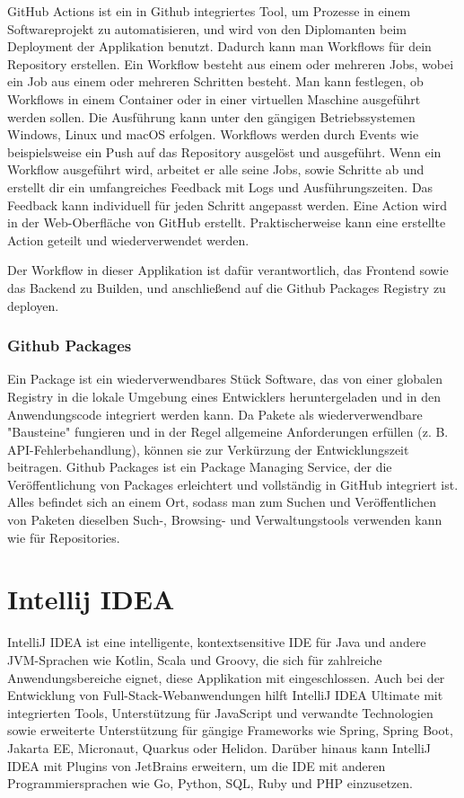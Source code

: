 GitHub Actions ist ein in Github integriertes Tool, um Prozesse in einem Softwareprojekt zu automatisieren, 
und wird von den Diplomanten beim Deployment der Applikation benutzt. 
Dadurch kann man Workflows für dein Repository erstellen. Ein Workflow besteht aus einem oder mehreren Jobs, 
wobei ein Job aus einem oder mehreren Schritten besteht. Man kann festlegen, ob Workflows in einem Container oder in einer virtuellen 
Maschine ausgeführt werden sollen. Die Ausführung kann unter den gängigen Betriebssystemen Windows, Linux und macOS erfolgen. 
Workflows werden durch Events wie beispielsweise ein Push auf das Repository ausgelöst und ausgeführt. Wenn ein Workflow ausgeführt wird, 
arbeitet er alle seine Jobs, sowie Schritte ab und erstellt dir ein umfangreiches Feedback mit Logs und Ausführungszeiten. 
Das Feedback kann individuell für jeden Schritt angepasst werden. Eine Action wird in der Web-Oberfläche von GitHub erstellt. 
Praktischerweise kann eine erstellte Action geteilt und wiederverwendet werden.
\cite{sysarch-github-4}

Der Workflow in dieser Applikation ist dafür verantwortlich, das Frontend sowie das Backend zu Builden, und anschließend auf die Github Packages Registry zu deployen.

\subsubsection{Github Packages}

Ein Package ist ein wiederverwendbares Stück Software, das von einer globalen Registry in die lokale Umgebung eines Entwicklers heruntergeladen und 
in den Anwendungscode integriert werden kann. Da Pakete als wiederverwendbare "Bausteine" fungieren und in der Regel allgemeine Anforderungen erfüllen 
(z. B. API-Fehlerbehandlung), können sie zur Verkürzung der Entwicklungszeit beitragen. Github Packages ist ein Package Managing Service, 
der die Veröffentlichung von Packages erleichtert und vollständig in GitHub integriert ist. Alles befindet sich an einem Ort, 
sodass man zum Suchen und Veröffentlichen von Paketen dieselben Such-, Browsing- und Verwaltungstools verwenden kann wie für Repositories.
\cite{sysarch-github-5}

\section{Intellij IDEA}

IntelliJ IDEA ist eine intelligente, kontextsensitive IDE für Java und andere JVM-Sprachen wie Kotlin, Scala und Groovy, die sich für zahlreiche 
Anwendungsbereiche eignet, diese Applikation mit eingeschlossen. Auch bei der Entwicklung von Full-Stack-Webanwendungen hilft IntelliJ IDEA Ultimate mit integrierten Tools, 
Unterstützung für JavaScript und verwandte Technologien sowie erweiterte Unterstützung für gängige Frameworks wie Spring, Spring Boot, Jakarta EE, Micronaut, 
Quarkus oder Helidon. Darüber hinaus kann IntelliJ IDEA mit Plugins von JetBrains erweitern, um die IDE mit anderen Programmiersprachen wie 
Go, Python, SQL, Ruby und PHP einzusetzen. 
\cite{sysarch-intellij-1}

